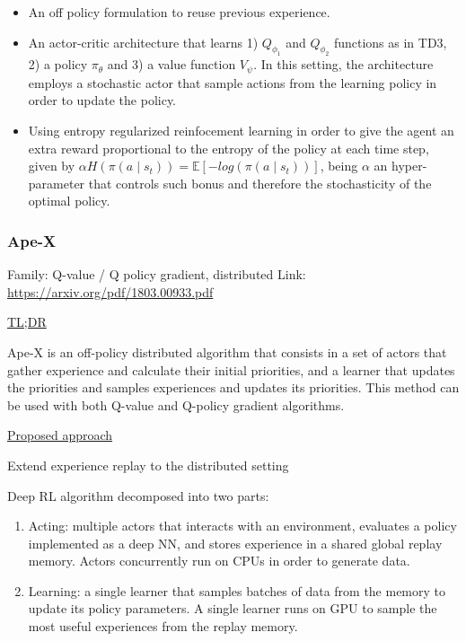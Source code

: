 \documentclass[12pt, english]{article}
\begin{document}
\begin{itemize}
  \item An off policy formulation to reuse previous experience.
  \item An actor-critic architecture that learns 1) $Q_{\phi_1}$ and $Q_{\phi_2}$ functions as in TD3, 2) a policy $\pi_\theta$ and 3) a value function $V_\psi$. In this setting, the architecture employs a stochastic actor that sample actions from the learning policy in order to update the policy.
  \item Using entropy regularized reinfocement learning in order to give the agent an extra reward proportional to the entropy of the policy at each time step, given by $\alpha H(\pi(a \mid s_t)) = \mathbb{E}[-log(\pi(a \mid s_t))]$, being $\alpha$ an hyper-parameter that controls such bonus and therefore the stochasticity of the optimal policy.
\end{itemize}


\subsubsection{Ape-X}
\label{Ape-X}

Family: Q-value / Q policy gradient, distributed
Link: \url{https://arxiv.org/pdf/1803.00933.pdf}

\underline{TL;DR}

Ape-X \cite{} is an off-policy distributed algorithm that consists in a set of actors that gather experience and calculate their initial priorities, and a learner that updates the priorities and samples experiences and updates its priorities. This method can be used with both Q-value and Q-policy gradient algorithms.

\underline{Proposed approach}

Extend experience replay to the distributed setting

Deep RL algorithm decomposed into two parts:

\begin{enumerate}
  \item Acting: multiple actors that interacts with an environment, evaluates a policy implemented as a deep NN, and stores experience in a shared global replay memory. Actors concurrently run on CPUs in order to generate data.
  \item Learning: a single learner that samples batches of data from the memory to update its policy parameters. A single learner runs on GPU to sample the most useful experiences from the replay memory.
\end{enumerate}
\end{document}
